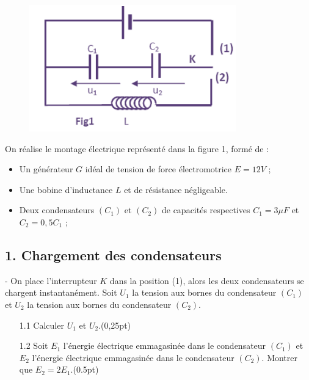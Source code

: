 \documentclass[12pt]{article}
\begin{document}
\begin{figure}
  \vspace{-1cm}
\includegraphics[width=1\linewidth]{./lc.png} 
\end{figure}

On réalise le montage électrique représenté dans la figure 1, formé de :
\begin{itemize}
    \item Un générateur $G$ idéal de tension de force électromotrice $E = 12V$ ;
    \item Une bobine d’inductance $L$ et de résistance négligeable.
    \item Deux condensateurs $(C_1)$ et $(C_2)$ de capacités respectives $C_1 = 3 \mu F$ et $C_2 = 0,5 C_1$ ;

\end{itemize}

\subsection*{1. Chargement des condensateurs}
    - On place l’interrupteur $K$ dans la position (1), alors les deux condensateurs se chargent instantanément. Soit $U_1$ la tension aux bornes du condensateur $(C_1)$ et $U_2$ la tension aux bornes du condensateur $(C_2)$.

\begin{enumerate}
  \item[1.1] Calculer $U_1$ et $U_2$.\dotfill(0,25pt)
  \item[1.2] Soit $E_1$ l’énergie électrique emmagasinée dans le condensateur $(C_1)$ et $E_2$ l’énergie électrique emmagasinée dans le condensateur $(C_2)$. Montrer que $E_2 = 2E_1$.\dotfill(0.5pt)
\end{enumerate}
\end{document}
